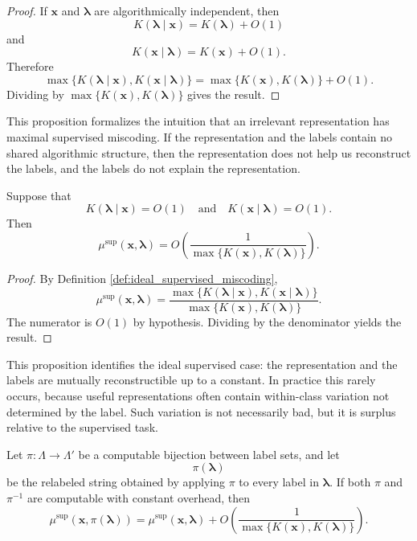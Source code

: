 \begin{proof}
If \(\mathbf{x}\) and \(\boldsymbol{\lambda}\) are algorithmically independent, then
\[
    K(\boldsymbol{\lambda}\mid \mathbf{x}) = K(\boldsymbol{\lambda})+O(1)
\]
and
\[
    K(\mathbf{x}\mid \boldsymbol{\lambda}) = K(\mathbf{x})+O(1).
\]
Therefore
\[
    \max\{K(\boldsymbol{\lambda}\mid \mathbf{x}),K(\mathbf{x}\mid \boldsymbol{\lambda})\}
    =
    \max\{K(\mathbf{x}),K(\boldsymbol{\lambda})\}+O(1).
\]
Dividing by \(\max\{K(\mathbf{x}),K(\boldsymbol{\lambda})\}\) gives the result.
\end{proof}

This proposition formalizes the intuition that an irrelevant representation has maximal supervised miscoding. If the representation and the labels contain no shared algorithmic structure, then the representation does not help us reconstruct the labels, and the labels do not explain the representation.

\begin{proposition}
\label{prop:supervised_miscoding_equivalence}
Suppose that
\[
    K(\boldsymbol{\lambda}\mid \mathbf{x})=O(1)
    \quad\text{and}\quad
    K(\mathbf{x}\mid \boldsymbol{\lambda})=O(1).
\]
Then
\[
    \mu^{\mathrm{sup}}(\mathbf{x},\boldsymbol{\lambda})
    =
    O\left(
        \frac{1}
        {\max\{K(\mathbf{x}),K(\boldsymbol{\lambda})\}}
    \right).
\]
\end{proposition}

\begin{proof}
By Definition \ref{def:ideal_supervised_miscoding},
\[
    \mu^{\mathrm{sup}}(\mathbf{x},\boldsymbol{\lambda})
    =
    \frac{
        \max\{K(\boldsymbol{\lambda}\mid \mathbf{x}),K(\mathbf{x}\mid \boldsymbol{\lambda})\}
    }
    {\max\{K(\mathbf{x}),K(\boldsymbol{\lambda})\}}.
\]
The numerator is \(O(1)\) by hypothesis. Dividing by the denominator yields the result.
\end{proof}

This proposition identifies the ideal supervised case: the representation and the labels are mutually reconstructible up to a constant. In practice this rarely occurs, because useful representations often contain within-class variation not determined by the label. Such variation is not necessarily bad, but it is surplus relative to the supervised task.

\begin{proposition}
\label{prop:supervised_miscoding_relabeling}
Let \(\pi:\Lambda\to\Lambda'\) be a computable bijection between label sets, and let
\[
    \pi(\boldsymbol{\lambda})
\]
be the relabeled string obtained by applying \(\pi\) to every label in \(\boldsymbol{\lambda}\). If both \(\pi\) and \(\pi^{-1}\) are computable with constant overhead, then
\[
    \mu^{\mathrm{sup}}(\mathbf{x},\pi(\boldsymbol{\lambda}))
    =
    \mu^{\mathrm{sup}}(\mathbf{x},\boldsymbol{\lambda})
    +
    O\left(
        \frac{1}
        {\max\{K(\mathbf{x}),K(\boldsymbol{\lambda})\}}
    \right).
\]
\end{proposition}

